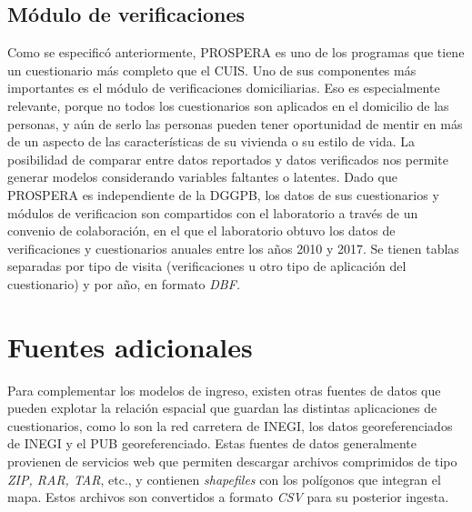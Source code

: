 \subsection*{Módulo de verificaciones}
Como se especificó anteriormente, PROSPERA es uno de los programas que tiene un cuestionario más completo que el CUIS. Uno de sus componentes más importantes es el módulo de verificaciones domiciliarias. Eso es especialmente relevante, porque no todos los cuestionarios son aplicados en el domicilio de las personas, y aún de serlo las personas pueden tener oportunidad de mentir en más de un aspecto de las características de su vivienda o su estilo de vida. La posibilidad de comparar entre datos reportados y datos verificados nos permite generar modelos considerando variables faltantes o latentes. Dado que PROSPERA es independiente de la DGGPB, los datos de sus cuestionarios y módulos de verificacion son compartidos con el laboratorio a través de un convenio de colaboración, en el que el laboratorio obtuvo los datos de verificaciones y cuestionarios anuales entre los años 2010 y 2017. Se tienen tablas separadas por tipo de visita (verificaciones u otro tipo de aplicación del cuestionario) y por año, en formato \textit{DBF.}
\section*{Fuentes adicionales}
Para complementar los modelos de ingreso, existen otras fuentes de datos que pueden explotar la relación espacial que guardan las distintas aplicaciones de cuestionarios, como lo son la red carretera de INEGI, los datos georeferenciados de INEGI y el PUB georeferenciado. Estas fuentes de datos generalmente provienen de servicios web que permiten descargar archivos comprimidos de tipo \textit{ZIP, RAR, TAR}, etc., y contienen \textit{shapefiles} con los polígonos que integran el mapa. Estos archivos son convertidos a formato \textit{CSV} para su posterior ingesta.
